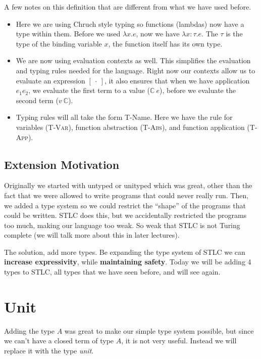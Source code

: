 \documentclass{lecturenotes}
\begin{document}
\noindent A few notes on this definition that are different from what we have used before. 
\begin{itemize}
  \item Here we are using Chruch style typing so functions (lambdas) now have a type within them. 
    Before we used $\lambda x.e$, now we have $\lambda x:\tau.e$. 
    The $\tau$ is the type of the binding variable $x$, the function itself has its own type.
  \item We are now using evaluation contexts as well. 
    This simplifies the evaluation and typing rules needed for the language. 
    Right now our contexts allow us to evaluate an expression $[~\cdot~]$, it also ensures that when we have application $e_1 e_2$, we evaluate the first term to a value ($\mathbb{C}~e$), before we evaluate the second term ($v~\mathbb{C}$).
  \item Typing rules will all take the form T-Name. 
    Here we have the rule for variables (\textsc{T-Var}), function abstraction (\textsc{T-Abs}), and function application (\textsc{T-App}). 
\end{itemize}

\subsection{Extension Motivation}

Originally we started with untyped or unityped which was great, other than the fact that we were allowed to write programs that could never really run. 
  Then, we added a type system so we could restrict the ``shape'' of the programs that could be written. 
  STLC does this, but we accidentally restricted the programs too much, making our language too weak.
  So weak that STLC is not Turing complete (we will talk more about this in later lectures). 

The solution, add more types. Be expanding the type system of STLC we can \textbf{increase expressivity}, while \textbf{maintaining safety}. 
  Today we will be adding 4 types to STLC, all types that we have seen before, and will see again. 

\section{Unit}

Adding the type $A$ was great to make our simple type system possible, but since we can't have a closed term of type $A$, it is not very useful.
  Instead we will replace it with the type \textit{unit}. 
\end{document}
